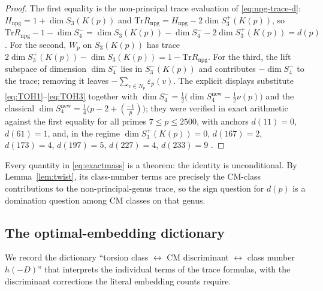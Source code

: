 \documentclass[10pt,a4paper]{amsart}
\newcommand{\Tr}{\mathrm{Tr}}
\newcommand{\snew}{S^{\mathrm{new}}}
\newcommand{\eps}{\varepsilon}
\providecommand{\kro}[2]{\left(\frac{#1}{#2}\right)}
\providecommand{\snew}{S^{\mathrm{new}}}
\begin{document}
	\begin{proof}
		The first equality is the non-principal trace evaluation of
		\eqref{eq:npg-trace-d}: $H_{\mathrm{npg}}=1+\dim S_3(K(p))$ and
		$\Tr R_{\mathrm{npg}}=H_{\mathrm{npg}}-2\dim S_3^+(K(p))$, so
		$\Tr R_{\mathrm{npg}}-1-\dim S_4^-
		=\dim S_3(K(p))-\dim S_4^--2\dim S_3^+(K(p))=d(p)$. For the second,
		$W_p$ on $S_3(K(p))$ has trace
		$2\dim S_3^+(K(p))-\dim S_3(K(p))=1-\Tr R_{\mathrm{npg}}$. For the third,
		the lift subspace of dimension $\dim S_4^-$ lies in $S_3^-(K(p))$
		\cite{IPY2013} and contributes $-\dim S_4^-$ to the trace; removing it
		leaves $-\sum_{v\in N_p}\eps_p(v)$. The explicit displays substitute
		\eqref{eq:TOH1}--\eqref{eq:TOH3}
		together with $\dim S_4^-=\tfrac12\bigl(\dim\snew_4-\tfrac12\nu(p)\bigr)$
		and the classical $\dim\snew_4=\tfrac14\bigl(p-2+\kro{-1}{p}\bigr)$; they were verified
		in exact arithmetic against the first equality for all primes
		$7\le p\le2500$, with anchors $d(11)=0$, $d(61)=1$, and, in the regime
		$\dim S_3^+(K(p))=0$, $d(167)=2$, $d(173)=4$, $d(197)=5$, $d(227)=4$,
		$d(233)=9$ \cite{artifact}.
	\end{proof}
	
	Every quantity in \eqref{eq:exactmass} is a theorem: the identity is
	unconditional. By Lemma~\ref{lem:twist}, its class-number terms are
	precisely the CM-class contributions to the non-principal-genus trace, so
	the sign question for $d(p)$ is a domination question among CM classes on
	that genus.
	
	\subsection{The optimal-embedding dictionary}
	\label{ss:twist}
	
	We record the dictionary ``torsion class $\leftrightarrow$ CM discriminant
	$\leftrightarrow$ class number $h(-D)$'' that interprets the individual
	terms of the trace formulas, with the discriminant corrections the literal
	embedding counts require.
	
\end{document}

